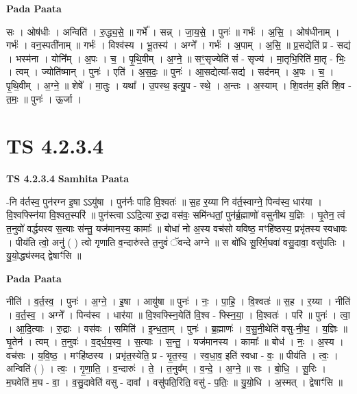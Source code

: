 \documentclass[17pt]{extarticle}
\begin{document}
\textbf{Pada Paata} \newline

सः । ओष॑धीः । अन्विति॑ । रु॒द्ध्य॒से॒ ॥ गर्भे᳚ । सन्न् । जा॒य॒से॒ । पुनः॑ ॥ गर्भः॑ । अ॒सि॒ । ओष॑धीनाम् । गर्भः॑ । वन॒स्पती॑नाम् ॥ गर्भः॑ । विश्व॑स्य । भू॒तस्य॑ । अग्ने᳚ । गर्भः॑ । अ॒पाम् । अ॒सि॒ ॥ प्र॒सद्येति॑ प्र - सद्य॑ । भस्म॑ना । योनि᳚म् । अ॒पः । च॒ । पृ॒थि॒वीम् । अ॒ग्ने॒ ॥ सꣳ॒॒सृज्येति॑ सं - सृज्य॑ । मा॒तृभि॒रिति॑ मा॒तृ - भिः॒ । त्वम् । ज्योति॑ष्मान् । पुनः॑ । एति॑ । अ॒स॒दः॒ ॥ पुनः॑ । आ॒सद्येत्या᳚-सद्य॑ । सद॑नम् । अ॒पः । च॒ । पृ॒थि॒वीम् । अ॒ग्ने॒ ॥ शेषे᳚ । मा॒तुः । यथा᳚ । उ॒पस्थ॒ इत्यु॒प - स्थे॒ । अ॒न्तः । अ॒स्याम् । शि॒वत॑म॒ इति॑ शि॒व - त॒मः॒ ॥ पुनः॑ । ऊ॒र्जा ।  \newline




\section*{ TS 4.2.3.4 }

\textbf{TS 4.2.3.4 } \newline
\textbf{Samhita Paata} \newline

-नि व॑र्तस्व॒ पुन॑रग्न इ॒षा ऽऽयु॑षा । पुन॑र्नः पाहि वि॒श्वतः॑ ॥ स॒ह र॒य्या नि व॑र्त॒स्वाग्ने॒ पिन्व॑स्व॒ धार॑या । वि॒श्वफ्स्नि॑या वि॒श्वत॒स्परि॑ ॥ पुन॑स्त्वा ऽऽदि॒त्या रु॒द्रा वस॑वः॒ समि॑न्धतां॒ पुन॑र्ब्र॒ह्माणो॑ वसुनीथ य॒ज्ञिः । घृ॒तेन॒ त्वं त॒नुवो॑ वर्द्धयस्व स॒त्याः स॑न्तु॒ यज॑मानस्य॒ कामाः᳚ ॥ बोधा॑ नो अ॒स्य वच॑सो यविष्ठ॒ मꣳहि॑ष्ठस्य॒ प्रभृ॑तस्य स्वधावः । पीय॑ति त्वो॒ अनु॑ ( ) त्वो गृणाति व॒न्दारु॑स्ते त॒नुवं॑ ॅवन्दे अग्ने ॥ स बो॑धि सू॒रिर्म॒घवा॑ वसु॒दावा॒ वसु॑पतिः । यु॒यो॒द्ध्य॑स्मद् द्वेषाꣳ॑सि ॥ \newline

\textbf{Pada Paata} \newline

नीति॑ । व॒र्त॒स्व॒ । पुनः॑ । अ॒ग्ने॒ । इ॒षा । आयु॑षा ॥ पुनः॑ । नः॒ । पा॒हि॒ । वि॒श्वतः॑ ॥ स॒ह । र॒य्या । नीति॑ । व॒र्त॒स्व॒ । अग्ने᳚ । पिन्व॑स्व । धार॑या ॥ वि॒श्वफ्स्नि॒येति॑ वि॒श्व - फ्स्नि॒या॒ । वि॒श्वतः॑ । परि॑ ॥ पुनः॑ । त्वा॒ । आ॒दि॒त्याः । रु॒द्राः । वस॑वः । समिति॑ । इ॒न्ध॒ता॒म् । पुनः॑ । ब्र॒ह्माणः॑ । व॒सु॒नी॒थेति॑ वसु-नी॒थ॒ । य॒ज्ञिः ॥ घृ॒तेन॑ । त्वम् । त॒नुवः॑ । व॒द्‌र्ध॒य॒स्व॒ । स॒त्याः । स॒न्तु॒ । यज॑मानस्य । कामाः᳚ ॥ बोध॑ । नः॒ । अ॒स्य । वच॑सः । य॒वि॒ष्ठ॒ । मꣳहि॑ष्ठस्य । प्रभृ॑त॒स्येति॒ प्र - भृ॒त॒स्य॒ । स्व॒धा॒व॒ इति॑ स्वधा - वः॒ ॥ पीय॑ति । त्वः॒ । अन्विति॑ ( ) । त्वः॒ । गृ॒णा॒ति॒ । व॒न्दारुः॑ । ते॒ । त॒नुव᳚म् । व॒न्दे॒ । अ॒ग्ने॒ ॥ सः । बो॒धि॒ । सू॒रिः । म॒घवेति॑ म॒घ - वा॒ । व॒सु॒दावेति॑ वसु - दावा᳚ । वसु॑पति॒रिति॒ वसु॑ - प॒तिः॒ ॥ यु॒यो॒धि । अ॒स्मत् । द्वेषाꣳ॑सि ॥  \newline
\end{document}
